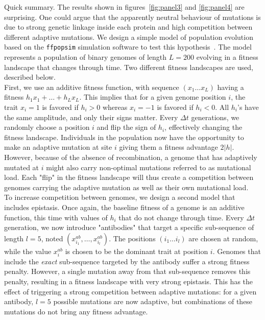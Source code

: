 \documentclass{article}
\begin{document}
	Quick summary. The results shown in figures~\ref{fig:panel3} and \ref{fig:panel4} are surprising. One could argue that the apparently neutral behaviour of mutations is due to strong genetic linkage inside each protein and high competition between different adaptive mutations. We design a simple model of population evolution based on the \texttt{ffpopsim} simulation software to test this hypothesis~\cite{10.1093/bioinformatics/bts633}. The model represents a population of binary genomes of length $L=200$ evolving in a fitness landscape that changes through time. 
	Two different fitness landscapes are used, described below. \\
	First, we use an additive fitness function, with sequence $(x_1\ldots x_L)$ having a fitness $h_1 x_1 + \ldots + h_L x_L$. This implies that for a given genome position $i$, the trait $x_i = 1$ is favored if $h_i>0$ whereas  $x_i = -1$ is favored if $h_i<0$. All $h_i$'s have the same amplitude, and only their signs matter. Every $\Delta t$ generations, we randomly choose a position $i$ and flip the sign of $h_i$, effectively changing the fitness landscape. Individuals in the population now have the opportunity to make an adaptive mutation at site $i$ giving them a fitness advantage $2\vert h \vert$. However, because of the absence of recombination, a genome that has adaptively mutated at $i$ might also carry non-optimal mutations referred to as mutational load. Each "flip" in the fitness landscape will thus create a competition between genomes carrying the adaptive mutation as well as their own mutational load. \\
	To increase competition between genomes, we design a second model that includes epistasis. Once again, the baseline fitness of a genome is an additive function, this time with values of $h_i$ that do not change through time. Every $\Delta t$ generation, we now introduce "antibodies" that target a specific sub-sequence of length $l=5$, noted $(x^{ab}_{i_1}, \ldots, x^{ab}_{i_l})$. The positions $(i_1\ldots i_l)$ are chosen at random, while the value $x^{ab}_i$ is chosen to be the dominant trait at position $i$. Genomes that include the \emph{exact} sub-sequence targeted by the antibody suffer a strong fitness penalty. However, a single mutation away from that sub-sequence removes this penalty, resulting in a fitness landscape with very strong epistasis. This has the effect of triggering a strong competition between adaptive mutations: for a given antibody, $l=5$ possible mutations are now adaptive, but combinations of these mutations do not bring any fitness advantage. \\
\end{document}
